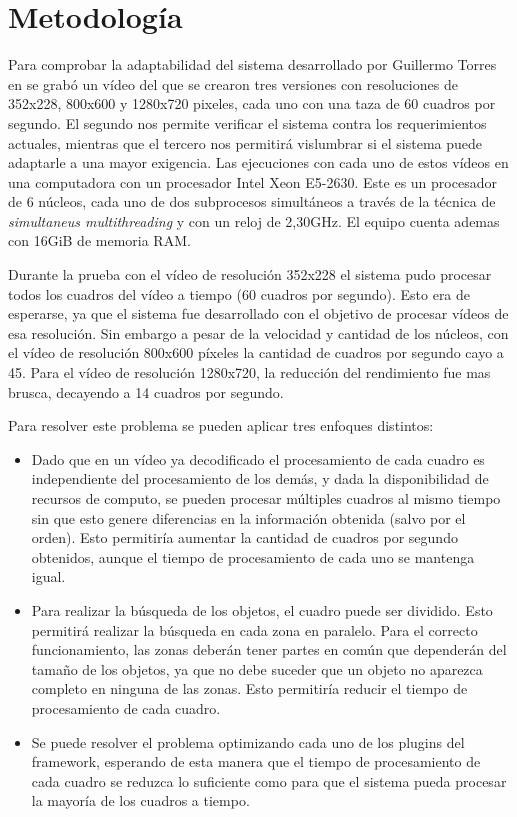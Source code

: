 
\section{Metodología}

Para comprobar la adaptabilidad del sistema desarrollado por Guillermo Torres en
\cite{torres2014} se grabó un vídeo del que se crearon tres versiones con
resoluciones de 352x228, 800x600 y 1280x720 pixeles, cada uno con una taza de 60
cuadros por segundo. El segundo nos permite verificar el sistema contra los
requerimientos actuales, mientras que el tercero nos permitirá vislumbrar si el
sistema puede adaptarle a una mayor exigencia. Las ejecuciones con cada uno de
estos vídeos en una computadora con un procesador Intel Xeon E5-2630. Este es un
procesador de 6 núcleos, cada uno de dos subprocesos simultáneos a través de la
técnica de \emph{simultaneus multithreading} y con un reloj de 2,30GHz. El
equipo cuenta ademas con 16GiB de memoria RAM.

Durante la prueba con el vídeo de resolución 352x228 el sistema pudo procesar
todos los cuadros del vídeo a tiempo (60 cuadros por segundo). Esto era de
esperarse, ya que el sistema fue desarrollado con el objetivo de procesar vídeos
de esa resolución. Sin embargo a pesar de la velocidad y cantidad de los
núcleos, con el vídeo de resolución 800x600 píxeles la cantidad de cuadros por
segundo cayo a 45. Para el vídeo de resolución 1280x720, la reducción del
rendimiento fue mas brusca, decayendo a 14 cuadros por segundo.

Para resolver este problema se pueden aplicar tres enfoques distintos:

\begin{itemize}

\item 	Dado que en un vídeo ya decodificado el procesamiento de cada cuadro es
	independiente del procesamiento de los demás, y dada la disponibilidad
	de recursos de computo, se pueden procesar múltiples cuadros al mismo
	tiempo sin que esto genere diferencias en la información obtenida (salvo
	por el orden). Esto permitiría aumentar la cantidad de cuadros por
	segundo obtenidos, aunque el tiempo de procesamiento de cada uno se
	mantenga igual.

\item	Para realizar la búsqueda de los objetos, el cuadro puede ser dividido.
	Esto permitirá realizar la búsqueda en cada zona en paralelo. Para el
	correcto funcionamiento, las zonas deberán tener partes en común que
	dependerán del tamaño de los objetos, ya que no debe suceder que un
	objeto no aparezca completo en ninguna de las zonas. Esto permitiría
	reducir el tiempo de procesamiento de cada cuadro.

\item	Se puede resolver el problema optimizando cada uno de los plugins del
	framework, esperando de esta manera que el tiempo de procesamiento de
	cada cuadro se reduzca lo suficiente como para que el sistema pueda
	procesar la mayoría de los cuadros a tiempo.

\end{itemize}

